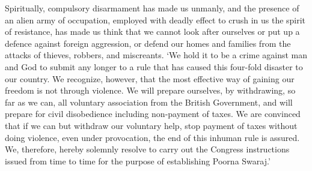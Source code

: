 Spiritually, compulsory disarmament has made us unmanly, and the presence of an alien army of occupation, employed with deadly effect to crush in us the spirit of resistance, has made us think that we cannot look after ourselves or put up a defence against foreign aggression, or defend our homes and families from the attacks of thieves, robbers, and miscreants. `We hold it to be a crime against man and God to submit any longer to a rule that has caused this four-fold disaster to our country. We recognize, however, that the most effective way of gaining our freedom is not through violence. We will prepare ourselves, by withdrawing, so far as we can, all voluntary association from the British Government, and will prepare for civil disobedience including non-payment of taxes. We are convinced that if we can but withdraw our voluntary help, stop payment of taxes without doing violence, even under provocation, the end of this inhuman rule is assured. We, therefore, hereby solemnly resolve to carry out the Congress instructions issued from time to time for the purpose of establishing Poorna Swaraj.'
